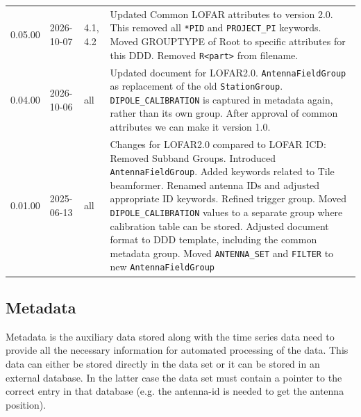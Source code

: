 \documentclass[a4paper,10pt,bibtotoc]{scrartcl}
\begin{document}
\begin{center}
  \tablelasttail{\hline}
  \begin{supertabular}{lllp{9.5cm}}
    0.05.00 & 2026-10-07 & 4.1, 4.2 &  Updated Common LOFAR attributes to version 2.0. This removed all \texttt{*PID} and \texttt{PROJECT\_PI} keywords. Moved GROUPTYPE of Root to specific attributes for this DDD. Removed \texttt{R<part>} from filename. \\
    0.04.00 & 2026-10-06 & all &  Updated document for LOFAR2.0. \texttt{AntennaFieldGroup} as replacement of the old \texttt{StationGroup}. \texttt{DIPOLE\_CALIBRATION} is captured in metadata again, rather than its own group. After approval of common attributes we can make it version 1.0. \\
    0.01.00 & 2025-06-13 & all   & Changes for LOFAR2.0 compared to LOFAR ICD: Removed Subband Groups. Introduced \texttt{AntennaFieldGroup}. Added keywords related to Tile beamformer. Renamed antenna IDs and adjusted appropriate ID keywords. Refined trigger group.   Moved \texttt{DIPOLE\_CALIBRATION} values to a separate group where calibration table can be stored. Adjusted document format to DDD template, including the common metadata group. Moved \texttt{ANTENNA\_SET} and \texttt{FILTER} to new \texttt{AntennaFieldGroup} \\
 \end{supertabular}
\end{center}


\subsection{Metadata}
\label{sec:metadata}

Metadata is the auxiliary data stored along with the time series data need to
provide all the necessary information for automated processing of the data.
This data can either be stored directly in the data set or it can be stored
in an external database. In the latter case the data set must contain a
pointer to the correct entry in that database (e.g. the antenna-id is needed
to get the antenna position).
\end{document}
